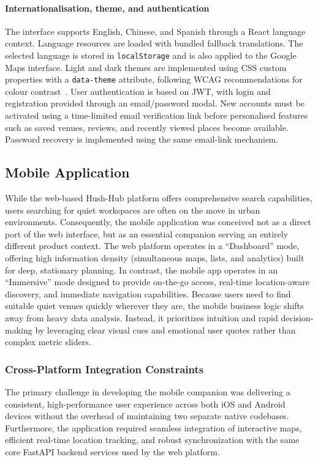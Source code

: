 \documentclass[conference]{IEEEtran}
\begin{document}
\paragraph{Internationalisation, theme, and authentication}
The interface supports English, Chinese, and Spanish through a React language context. Language resources are loaded with bundled fallback translations.  The selected language is stored in \texttt{localStorage} and is also applied to the Google Maps interface. Light and dark themes are implemented using CSS custom properties with a \texttt{data-theme} attribute, following WCAG recommendations for colour contrast~\cite{wcag22}. User authentication is based on JWT, with login and registration provided through an email/password modal. New accounts must be activated using a time-limited email verification link before personalised features such as saved venues, reviews, and recently viewed places become available. Password recovery is implemented using the same email-link mechanism.


\subsection{Mobile Application}

While the web-based Hush-Hub platform offers comprehensive search capabilities, users searching for quiet workspaces are often on the move in urban environments. Consequently, the mobile application was conceived not as a direct port of the web interface, but as an essential companion serving an entirely different product context. The web platform operates in a ``Dashboard'' mode, offering high information density (simultaneous maps, lists, and analytics) built for deep, stationary planning. In contrast, the mobile app operates in an ``Immersive'' mode designed to provide on-the-go access, real-time location-aware discovery, and immediate navigation capabilities. Because users need to find suitable quiet venues quickly wherever they are, the mobile business logic shifts away from heavy data analysis. Instead, it prioritizes intuition and rapid decision-making by leveraging clear visual cues and emotional user quotes rather than complex metric sliders.


\subsubsection{Cross-Platform Integration Constraints}
The primary challenge in developing the mobile companion was delivering a consistent, high-performance user experience across both iOS and Android devices without the overhead of maintaining two separate native codebases. Furthermore, the application required seamless integration of interactive maps, efficient real-time location tracking, and robust synchronization with the same core FastAPI backend services used by the web platform.
\end{document}
